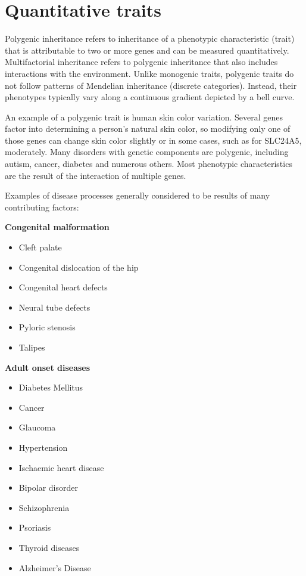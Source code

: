 \hypertarget{quantitative-traits}{%
\section{Quantitative traits}\label{quantitative-traits}}

Polygenic inheritance refers to inheritance of a phenotypic characteristic (trait) that is attributable to two or more genes and can be measured quantitatively. Multifactorial inheritance refers to polygenic inheritance that also includes interactions with the environment. Unlike monogenic traits, polygenic traits do not follow patterns of Mendelian inheritance (discrete categories). Instead, their phenotypes typically vary along a continuous gradient depicted by a bell curve.

An example of a polygenic trait is human skin color variation. Several genes factor into determining a person's natural skin color, so modifying only one of those genes can change skin color slightly or in some cases, such as for SLC24A5, moderately. Many disorders with genetic components are polygenic, including autism, cancer, diabetes and numerous others. Most phenotypic characteristics are the result of the interaction of multiple genes.

Examples of disease processes generally considered to be results of many contributing factors:

\textbf{Congenital malformation}

\begin{itemize}
\tightlist
\item
  Cleft palate
\item
  Congenital dislocation of the hip
\item
  Congenital heart defects
\item
  Neural tube defects
\item
  Pyloric stenosis
\item
  Talipes
\end{itemize}

\textbf{Adult onset diseases}

\begin{itemize}
\tightlist
\item
  Diabetes Mellitus
\item
  Cancer
\item
  Glaucoma
\item
  Hypertension
\item
  Ischaemic heart disease
\item
  Bipolar disorder
\item
  Schizophrenia
\item
  Psoriasis
\item
  Thyroid diseases
\item
  Alzheimer's Disease
\end{itemize}

